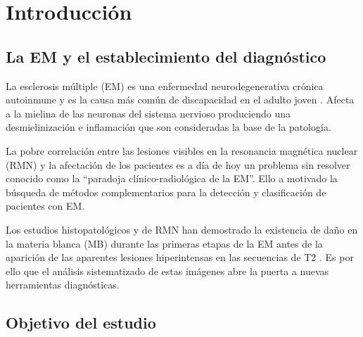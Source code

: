\documentclass[fleqn,10pt]{UICArticle} %
\affiliation{\textsuperscript{1}\textit{Facultad de Medicina, Universitat Internacional de Catalunya, Barcelona, Spain}}
\affiliation{*\textbf{Datos de contacto}: gabriel.mp@uic.es} %
\begin{document}
\flushbottom 

\maketitle

\thispagestyle{empty} 
\clearpage

\tableofcontents


\section{Introducción}

\subsection{La EM y el establecimiento del diagnóstico}

La esclerosis múltiple (EM) es una enfermedad neurodegenerativa crónica autoinmune y es la causa más común de discapacidad en el adulto joven \cite{Polman2011}. Afecta a la mielina de las neuronas del sistema nervioso produciendo una desmielinización e inflamación que son consideradas la base de la patología.

La pobre correlación entre las lesiones visibles en la resonancia magnética nuclear (RMN) y la afectación de los pacientes es a día de hoy un problema sin resolver conocido como la “paradoja clínico-radiológica de la EM”. Ello a motivado la búsqueda de métodos complementarios para la detección y clasificación de pacientes con EM.

Los estudios histopatológicos y de RMN han demostrado la existencia de daño en la materia blanca (MB) durante las primeras etapas de la EM antes de la aparición de las aparentes lesiones hiperintensas en las secuencias de T2 \cite{Beer2016}. Es por ello que el análisis sistematizado de estas imágenes abre la puerta a nuevas herramientas diagnósticas.


\subsection{Objetivo del estudio}
\end{document}
